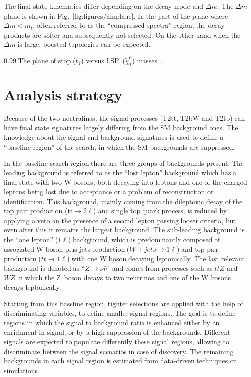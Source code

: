 The final state kinematics differ depending on the decay mode and $\Delta m$. The $\Delta m$ plane is shown in Fig.~\ref{fig:figures/dmplane}. In the part of the plane where $\Delta m < m_t$, often referred to as the ``compressed spectra'' region, the decay products are softer and subsequently not selected. On the other hand when the $\Delta m$ is large, boosted topologies can be expected. 


                 {0.99}       %
                 { The plane of stop ($\tilde{t}_{1}$) versus LSP~($\tilde{\chi}^{0}_{1}$) masses~\cite{Aad:2014kra}. }


\section{Analysis strategy~\label{sec:strategy}}

Because of the two neutralinos, the signal processes (T2tt, T2bW and T2tb)  can have final state signatures largely differing from the SM background ones. The knowledge about the signal and background signatures is used to define a ``baseline region'' of the search, in which the SM backgrounds are suppressed. 

In the baseline search region there are three groups of backgrounds present. The leading background is referred to as the ``lost lepton'' background which has a final state with two W bosons, both decaying into leptons and one of the charged leptons being lost due to acceptance or a problem of reconstruction or identification. This background, mainly coming from the dileptonic decay of the top pair production ($\mathrm{t\bar{t}} \to 2 \ell$) and single top quark process,  is reduced by applying a veto on the presence of a second lepton passing looser criteria, but even after this it remains the largest background. The sub-leading background is the ``one lepton'' ($1\ell$) background, which is predominantly composed of associated W boson plus jets production  ($W+jets \to 1\ell$) and top pair production ($t\bar{t} \to 1 \ell$) with one W boson decaying leptonically. The last relevant background is denoted as ``$Z \to \nu \bar{\nu}$'' and comes from processes such as $t\bar{t}Z$ and $WZ$ in which the Z~boson decays to two neutrinos and one of the W bosons decays leptonically.  

Starting from this baseline region, tighter selections are applied  with the help of discriminating variables, to define smaller signal regions. The goal is to define regions in which the signal to background ratio is enhanced either by an enrichment in signal, or by a high suppression of the backgrounds. Different signals are expected to populate differently these signal regions, allowing to discriminate between the signal scenarios in case of discovery. The remaining backgrounds in each signal region is estimated from data-driven techniques or simulations. 

